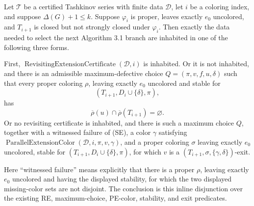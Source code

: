 \begin{theorem}
Let \(\mathcal T\) be a certified Tashkinov series with finite data
\(\mathcal D\), let \(i\) be a coloring index, and suppose
\(\Delta(G)+1\leq k\).  Suppose \(\varphi_i\) is proper, leaves exactly
\(e_0\) uncolored, and \(T_{i+1}\) is closed but not strongly closed
under \(\varphi_i\).  Then exactly the data needed to select the next
Algorithm 3.1 branch are inhabited in one of the following three forms.

First, \(\operatorname{RevisitingExtensionCertificate}(\mathcal D,i)\)
is inhabited.  Or it is not inhabited, and there is an admissible
maximum-defective choice \(Q=(\pi,v,f,u,\delta)\) such that every proper
coloring \(\rho\), leaving exactly \(e_0\) uncolored and stable for
\[
             (T_{i+1},D_i\cup\{\delta\},\pi),
\]
has
\[
 \overline\rho(u)\cap\overline\rho(T_{i+1})=\varnothing.        \tag{SE}
\]
Or no revisiting certificate is inhabited, and there is such a maximum
choice \(Q\), together with a witnessed failure of (SE), a color
\(\gamma\) satisfying
\(\operatorname{ParallelExtensionColor}(\mathcal D,i,\pi,v,\gamma)\),
and a proper coloring \(\sigma\) leaving exactly \(e_0\) uncolored,
stable for
\((T_{i+1},D_i\cup\{\delta\},\pi)\), for which \(v\) is a
\((T_{i+1},\sigma,\{\gamma,\delta\})\)-exit.

Here “witnessed failure” means explicitly that there is a proper
\(\rho\), leaving exactly \(e_0\) uncolored and having the displayed
stability, for which the two displayed missing-color sets are not
disjoint.  The conclusion is this inline disjunction over the existing
RE, maximum-choice, PE-color, stability, and exit predicates.
\end{theorem}
